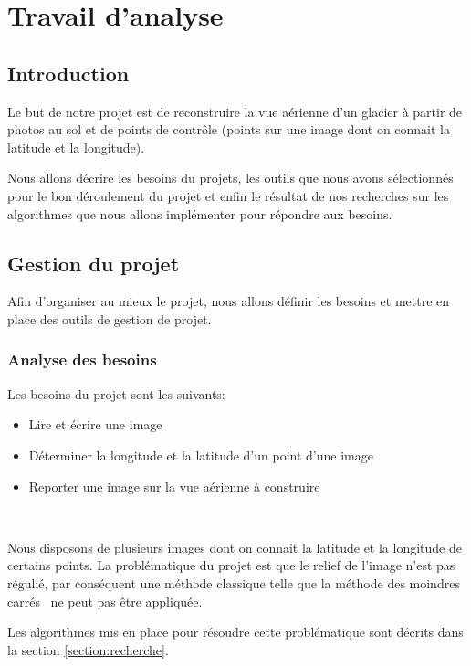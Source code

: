 \chapter{Travail d'analyse}
	
	\section*{Introduction}
	
	Le but de notre projet est de reconstruire la vue aérienne d'un glacier
	à partir de photos au sol et de points de contrôle (points sur une image
	dont on connait la latitude et la longitude).	
	
	Nous allons décrire les besoins du projets, les outils que 
	nous avons sélectionnés pour le bon déroulement du projet et
	enfin le résultat de nos recherches sur les algorithmes que
	nous allons implémenter pour répondre aux besoins.
	 
	\section{Gestion du projet}
	
	Afin d'organiser au mieux le projet, nous allons définir les besoins
	et mettre en place des outils de gestion de projet.
	
		\subsection{Analyse des besoins}
		
	Les besoins du projet sont les suivants:
		
	\begin{itemize}
		\item Lire et écrire une image
		\item Déterminer la longitude et la latitude d'un point d'une image
		\item Reporter une image sur la vue aérienne à construire
	\end{itemize}
		
	~
		
	Nous disposons de plusieurs images dont on connait la latitude et la
	longitude de certains points. La problématique du projet
	est que le relief de l'image n'est pas régulié, par conséquent une
	méthode classique telle que la méthode des moindres carrés~\cite{carre} 
	ne peut pas être appliquée.
		
	Les algorithmes mis en place pour résoudre cette problématique sont
	décrits dans la section \ref{section:recherche}.
		
